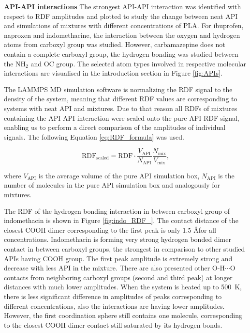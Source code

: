 \newpage
\textbf{API-API interactions}
The strongest API-API interaction was identified with respect to RDF amplitudes and plotted to study the change between neat API and simulations of mixtures with different concentrations of PLA. For ibuprofen, naproxen and indomethacine, the interaction between the oxygen and hydrogen atoms from carboxyl group was studied. However, carbamazepine does not contain a complete carboxyl group, the hydrogen bonding was studied between the N$\text{H}_\text{2}$ and OC group. The selected atom types involved in respective molecular interactions are visualised in the introduction section in Figure \ref{fig:APIs}. 

The LAMMPS MD simulation software is normalizing the RDF signal to the density of the system, meaning that different RDF values are corresponding to systems with neat API and mixtures. Due to that reason all RDFs of mixtures containing the API-API interaction were scaled onto the pure API RDF signal, enabling us to perform a direct comparison of the amplitudes of individual signals. The following Equation \ref{eq:RDF_formula} was used.\vspace{-0.5cm}

\begin{equation}\label{eq:RDF_formula}
	\text{RDF}_{\text{scaled}} = \text{RDF} \cdot \frac{V_{\text{API}}}{N_{\text{API}}} \frac{N_{\text{mix}}}{V_{\text{mix}}},
\end{equation}

\vspace{-0.2cm}

where $V_{\text{API}}$ is the average volume of the pure API simulation box, $N_{\text{API}}$ is the number of molecules in the pure API simulation box and analogously for mixtures.

The RDF of the hydrogen bonding interaction in between carboxyl group of indomethacin is shown in Figure \ref{fig:indo_RDF_}. The contact distance of the closest COOH dimer corresponding to the first peak is only 1.5 \AA for all concentrations. Indomethacin is forming very strong hydrogen bonded dimer contact in between carboxyl groups, the strongest in comparison to other studied APIs having COOH group. The first peak amplitude is extremely strong and decrease with less API in the mixture. There are also presented other O-H$\cdots$O contacts from neighboring carboxyl groups (second and third peak) at longer distances with much lower amplitudes. When the system is heated up to 500~K, there is less significant difference in amplitudes of peaks corresponding to different concentrations, also the interactions are having lower amplitudes. However, the first coordination sphere still contains one molecule, corresponding to the closest COOH dimer contact still saturated by its hydrogen bonds.


